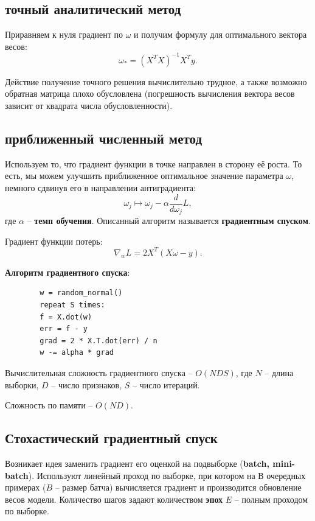 \documentclass[a4paper, 10pt, openany]{book} %
\begin{document}
	\subsection{точный аналитический метод}
	
	Приравняем к нуля градиент по $\omega$ и получим формулу для оптимального вектора весов:
	\begin{equation*}
		\omega_* = \left(X^T X\right)^{-1} X^T y.
	\end{equation*}
	
	Действие получение точного решения вычислительно трудное, а также возможно обратная матрица плохо обусловлена (погрешность вычисления вектора весов зависит от квадрата 	числа обусловленности).
	
	\subsection{приближенный численный метод}
	
	Используем то, что градиент функции в точке направлен в сторону её роста. То есть, мы можем улучшить приближенное оптимальное значение параметра $\omega$, немного сдвинув его в направлении антиградиента:
	\begin{equation*}
		\omega_j \mapsto \omega_j - \alpha \frac{d}{d \omega_j} L,
	\end{equation*}
	где $\alpha$ -- \textbf{темп обучения}. Описанный алгоритм называется \textbf{градиентным спуском}.
	
	Градиент функции потерь:
	\begin{equation*}
		\nabla_w L = 2 X^T \left(X\omega - y\right).
	\end{equation*}
	
	\textbf{Алгоритм градиентного спуска}:
	\begin{lstlisting}
		w = random_normal()
		repeat S times:
		f = X.dot(w)
		err = f - y
		grad = 2 * X.T.dot(err) / n
		w -= alpha * grad
	\end{lstlisting}
	
	Вычислительная сложность градиентного спуска -- $O(NDS)$, где $N$ -- длина выборки, $D$ -- число признаков, $S$ -- число итераций.
	
	Сложность по памяти -- $O(ND)$.
	
	\subsection{Стохастический градиентный спуск}
	
	Возникает идея заменить градиент его оценкой на подвыборке (\textbf{batch, mini-batch}). Используют линейный проход по выборке, при котором на $В$ очередных примерах ($B$ -- размер батча) вычисляется градиент и производится обновление весов модели. Количество шагов задают количеством \textbf{эпох} $E$ -- полным проходом по выборке.
	
\end{document}
